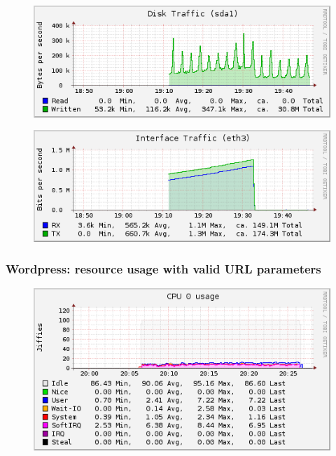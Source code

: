 \documentclass[Measurement results]{subfiles}
\begin{document}
\begin{figure}[H]
\centering
\includegraphics[scale=0.7]{images/results/wp_with_naxsi_incremented_allowed_parameters/disk.png}
\end{figure}

\begin{figure}[H]
\centering
\includegraphics[scale=0.7]{images/results/wp_with_naxsi_incremented_allowed_parameters/interface.png}
\end{figure}

\newpage
\subsubsection{Wordpress: resource usage with valid URL parameters}
\begin{figure}[H]
\centering
\includegraphics[scale=0.7]{images/results/wp_with_naxsi_incremented_disallowed_parameters/cpu.png}
\end{figure}
\end{document}
